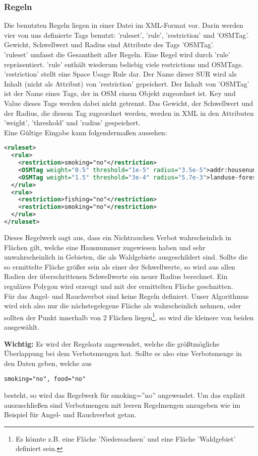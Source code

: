\subsubsection{Regeln}
\label{sec:Eingabedaten_Wir}
Die benutzten Regeln liegen in einer Datei im XML-Format vor. Darin werden vier von uns definierte Tags benutzt: 'ruleset', 'rule',
'restriction' und 'OSMTag'. Gewicht, Schwellwert und Radius sind Attribute des Tags 'OSMTag'.\\
'ruleset' umfasst die Gesamtheit aller Regeln. Eine Regel wird durch 'rule' repräsentiert. 'rule' enthält wiederum beliebig viele
restrictions und OSMTags. 'restriction' stellt eine Space Usage Rule dar. Der Name dieser SUR wird als Inhalt (nicht als Attribut)
von 'restriction' gepeichert. Der Inhalt von 'OSMTag' ist der Name eines Tags, der in OSM einem Objekt zugeordnet ist. Key und Value
dieses Tags werden dabei nicht getrennt. Das Gewicht, der Schwellwert und der Radius, die diesem Tag zugeordnet werden, werden in XML
in den Attributen 'weight', 'threshold' und 'radius' gespeichert.\\
Eine Gültige Eingabe kann folgendermaßen aussehen:
\begin{lstlisting}[language=xml,frame=single]
<ruleset>
  <rule>
    <restriction>smoking="no"</restriction>
    <OSMTag weight="0.5" threshold="1e-5" radius="3.5e-5">addr:housenumber</OSMTag>
    <OSMTag weight="1.5" threshold="3e-4" radius="5.7e-3">landuse-forest</OSMTag>
  </rule>
  <rule>
    <restriction>fishing="no"</restriction>
    <restriction>smoking="no"</restriction>
  </rule>
</ruleset>
\end{lstlisting}
Dieses Regelwerk sagt aus, dass ein Nichtrauchen Verbot wahrscheinlich in Flächen gilt, welche eine Hausnummer zugewiesen haben
und sehr unwahrscheinlich in Gebieten, die als Waldgebiete ausgeschildert sind. Sollte die so ermittelte Fläche größer sein als
einer der Schwellwerte, so wird aus allen Radien der überschrittenen Schwellwerte ein neuer Radius berechnet. Ein reguläres Polygon
wird erzeugt und mit der ermittelten Fläche geschnitten.\\
Für das Angel- und Rauchverbot sind keine Regeln definiert. Unser Algorithmus wird sich also nur die nächstegelegene Fläche als wahrscheinlich nehmen,
oder sollten der Punkt innerhalb von 2 Flächen liegen\footnote{Es könnte z.B. eine Fläche 'Niedersachsen' und eine Fläche 'Waldgebiet' definiert sein.},
so wird die kleinere von beiden ausgewählt.

\textbf{Wichtig:} Es wird der Regelsatz angewendet, welche die größtmögliche Überlappung bei dem Verbotsmengen hat.
Sollte es also eine Verbotsmenge in den Daten geben, welche aus \begin{lstlisting}[frame=single]
smoking="no", food="no"
\end{lstlisting}
besteht, so wird das Regelwerk für smoking=''no'' angewendet. Um das explizit auszuschließen sind Verbotmengen mit leeren Regelmengen anzugeben
wie im Beispiel für Angel- und Rauchverbot getan.

